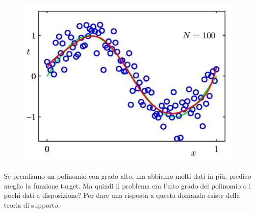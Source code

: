 \documentclass{article}
\begin{document}
\begin{figure}[H]
\centering
\includegraphics[scale=0.4]{Images/bigdatasethighpolgrade.png}
\end{figure}
Se prendiamo un polinomio con grado alto, ma abbiamo molti dati in più, predico meglio la funzione target. Ma quindi il problema era l'alto grado del polinomio o i pochi dati a disposizione? Per dare una risposta a questa domanda esiste della teoria di supporto.
\end{document}

